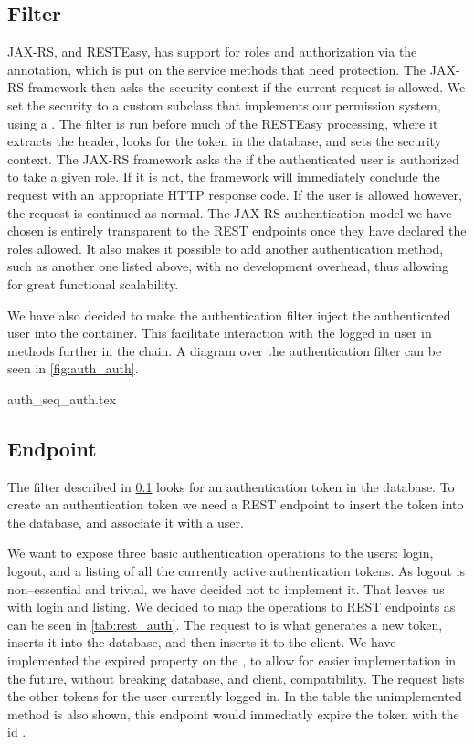 \subsection{Filter}
\label{subsec:auth_filter}

JAX-RS, and RESTEasy, has support for roles and authorization via the
 annotation, which is put on the service methods that need
protection. The JAX-RS framework then asks the security context if the current
request is allowed. We set the security to a custom subclass that implements our
permission system, using a . The filter is run
before much of the RESTEasy processing, where it extracts the header, looks for
the token in the database, and sets the security context. The JAX-RS framework
asks the  if the authenticated user is authorized to take
a given role. If it is not, the framework will immediately conclude the request
with an appropriate HTTP response code. If the user is allowed however, the
request is continued as normal. The JAX-RS authentication model we have chosen
is entirely transparent to the REST endpoints once they have declared the roles
allowed. It also makes it possible to add another authentication method, such as
another one listed above, with no development overhead, thus allowing for great
functional scalability.

We have also decided to make the authentication filter inject the authenticated
user into the container. This facilitate interaction with the logged in user in
methods further in the chain. A diagram over the authentication filter can be
seen in \cref{fig:auth_auth}.

{auth_seq_auth.tex}

\subsection{Endpoint}
The filter described in \cref{subsec:auth_filter} looks for an authentication
token in the database. To create an authentication token we need a REST endpoint
to insert the token into the database, and associate it with a user.

We want to expose three basic authentication operations to the users: login, logout,
and a listing of all the currently active authentication tokens. As logout is
non--essential and trivial, we have decided not to implement it. That leaves us
with login and listing. We decided to map the operations to REST endpoints as
can be seen in \cref{tab:rest_auth}. The  request to  is
what generates a new token, inserts it into the database, and then inserts it to
the client. We have implemented the expired property on the , to
allow for easier implementation in the future, without breaking database, and
client, compatibility. The  request lists the other tokens for the
user currently logged in. In the table the unimplemented  method is
also shown, this endpoint would immediatly expire the token with the id
.

